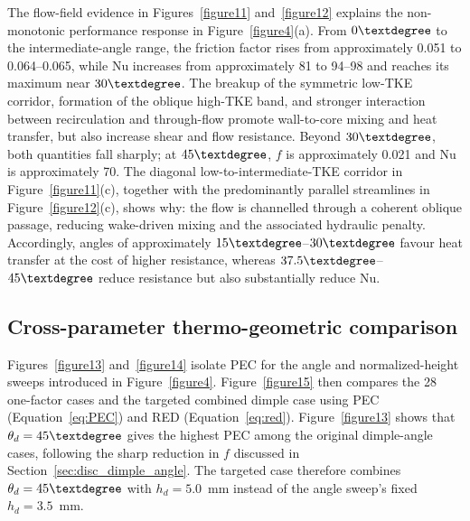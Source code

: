 \documentclass[energies,article,submit,moreauthors,noheaderline]{Definitions/mdpi}
\newcommand{\degree}{\texorpdfstring{\ensuremath{^\circ}}{\textdegree}}
\def\ensuremath#1{}%
\def\degree{\textdegree}%
\begin{document}
The flow-field evidence in Figures~\ref{figure11} and~\ref{figure12} explains the non-monotonic performance response in Figure~\ref{figure4}(a). From $0\degree$ to the intermediate-angle range, the friction factor rises from approximately 0.051 to 0.064--0.065, while Nu increases from approximately 81 to 94--98 and reaches its maximum near $30\degree$. The breakup of the symmetric low-TKE corridor, formation of the oblique high-TKE band, and stronger interaction between recirculation and through-flow promote wall-to-core mixing and heat transfer, but also increase shear and flow resistance. Beyond $30\degree$, both quantities fall sharply; at $45\degree$, $f$ is approximately 0.021 and Nu is approximately 70. The diagonal low-to-intermediate-TKE corridor in Figure~\ref{figure11}(c), together with the predominantly parallel streamlines in Figure~\ref{figure12}(c), shows why: the flow is channelled through a coherent oblique passage, reducing wake-driven mixing and the associated hydraulic penalty. Accordingly, angles of approximately $15\degree$--$30\degree$ favour heat transfer at the cost of higher resistance, whereas $37.5\degree$--$45\degree$ reduce resistance but also substantially reduce Nu.

\subsection{Cross-parameter thermo-geometric comparison}
\label{sec:tgg_comparison}

Figures~\ref{figure13} and~\ref{figure14} isolate PEC for the angle and normalized-height sweeps introduced in Figure~\ref{figure4}. Figure~\ref{figure15} then compares the 28 one-factor cases and the targeted combined dimple case using PEC (Equation~\eqref{eq:PEC}) and RED (Equation~\eqref{eq:red}). Figure~\ref{figure13} shows that $\theta_d=45\degree$ gives the highest PEC among the original dimple-angle cases, following the sharp reduction in $f$ discussed in Section~\ref{sec:disc_dimple_angle}. The targeted case therefore combines $\theta_d=45\degree$ with $h_d=5.0$~mm instead of the angle sweep's fixed $h_d=3.5$~mm.

\noindent\hfill
\par\vspace{\baselineskip}
\end{document}
